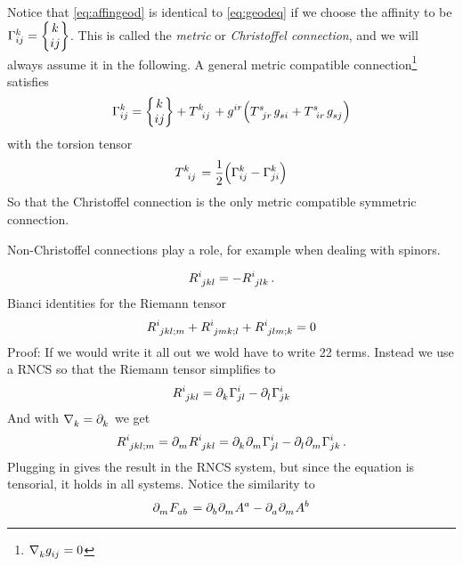 Notice that \eqref{eq:affingeod} is identical to \eqref{eq:geodeq} if we choose
the affinity to be $\Gamma^{k}_{i j}=\begin{Bmatrix} k \\ i j \end{Bmatrix}$. This is called the
\emph{metric} or \emph{Christoffel connection}, and we will
always assume it in the following.
A general metric compatible
connection\footnote{$\tensor{\nabla}{_k}\tensor{g}{_i_j}=0$} satisfies
\begin{equation}
\affin{k}{i}{j}=\cSym{k}{i}{j}+\tensor{T}{^k_i_j}
+\tensor{g}{^i^r}\left(\tensor{T}{^s_j_r}\tensor{g}{_s_i}+\tensor{T}{^s_i_r}\tensor{g}{_s_j}\right)
\end{equation}
with the torsion tensor
\begin{equation}
\tensor{T}{^k_i_j}=\frac{1}{2}\left(\affin{k}{i}{j}-\affin{k}{j}{i}\right)
\end{equation}
So that the Christoffel connection is the only metric compatible symmetric
connection.
\begin{remark}
Non-Christoffel connections play a role, for example when dealing with spinors.
\end{remark}
\begin{equation}
\tensor{R}{^i_j_k_l}=-\tensor{R}{^i_j_l_k}\,.
\end{equation}
Bianci identities for the Riemann tensor
\begin{equation}
\tensor{R}{^i_j_k_l_{;m}}+\tensor{R}{^i_j_m_k_{;l}}+\tensor{R}{^i_j_l_m_{;k}}=0
\end{equation}
Proof: If we would write it all out we wold have to write 22 terms. Instead we
use a RNCS so that the Riemann tensor simplifies to 
\begin{equation}
\tensor{R}{^i_j_k_l}
=\tensor{\partial}{_k}\affin{i}{j}{l}
-\tensor{\partial}{_l}\affin{i}{j}{k}
\end{equation}
And with $\tensor{\nabla}{_k}=\tensor{\partial}{_k}$ we get
\begin{equation}
\tensor{R}{^i_j_k_l_{;m}}
=\tensor{\partial}{_m}\tensor{R}{^i_j_k_l}
=\tensor{\partial}{_k}\tensor{\partial}{_m}\affin{i}{j}{l}
-\tensor{\partial}{_l}\tensor{\partial}{_m}\affin{i}{j}{k}\,.
\end{equation}
Plugging in gives the result in the RNCS system, but since the equation is
tensorial, it holds in all systems. Notice the similarity to 
\begin{equation}
\tensor{\partial}{_m}\tensor{F}{_a_b}
=\tensor{\partial}{_b}\tensor{\partial}{_m}\tensor{A}{^a}
-\tensor{\partial}{_a}\tensor{\partial}{_m}\tensor{A}{^b}
\end{equation}
